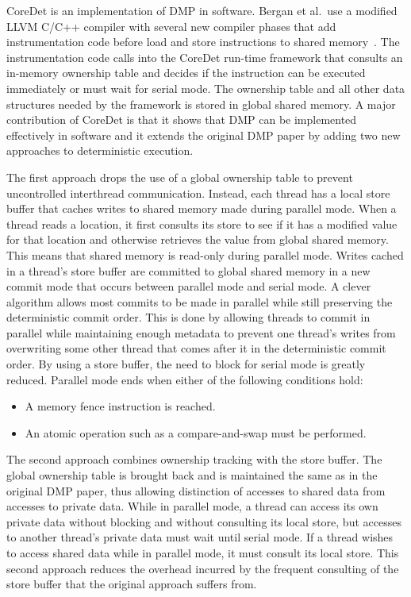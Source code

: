 CoreDet is an implementation of DMP in software.  Bergan et al.\ use a
modified LLVM C/C++ compiler with several new compiler phases that add
instrumentation code before load and store instructions to shared
memory~\cite{coredet}.  The instrumentation code calls into the
CoreDet run-time framework that consults an in-memory ownership table
and decides if the instruction can be executed immediately or must
wait for serial mode.  The ownership table and all other data
structures needed by the framework is stored in global shared memory.
A major contribution of CoreDet is that it shows that DMP can be
implemented effectively in software and it extends the original DMP
paper by adding two new approaches to deterministic execution.

The first approach drops the use of a global ownership table to
prevent uncontrolled interthread communication.  Instead, each thread
has a local store buffer that caches writes to shared memory made
during parallel mode.  When a thread reads a location, it first
consults its store to see if it has a modified value for that location
and otherwise retrieves the value from global shared memory.  This
means that shared memory is read-only during parallel mode.  Writes
cached in a thread's store buffer are committed to global shared
memory in a new commit mode that occurs between parallel mode and
serial mode.  A clever algorithm allows most commits to be made in
parallel while still preserving the deterministic commit order.  This
is done by allowing threads to commit in parallel while maintaining
enough metadata to prevent one thread's writes from overwriting some
other thread that comes after it in the deterministic commit order.
By using a store buffer, the need to block for serial mode is greatly
reduced.  Parallel mode ends when either of the following conditions
hold:

\begin{itemize}
\item A memory fence instruction is reached.

\item An atomic operation such as a compare-and-swap must be
  performed.
\end{itemize}

The second approach combines ownership tracking with the store buffer.
The global ownership table is brought back and is maintained the same
as in the original DMP paper, thus allowing distinction of accesses to
shared data from accesses to private data.  While in parallel mode, a
thread can access its own private data without blocking and without
consulting its local store, but accesses to another thread's private
data must wait until serial mode.  If a thread wishes to access shared
data while in parallel mode, it must consult its local store.  This
second approach reduces the overhead incurred by the frequent
consulting of the store buffer that the original approach suffers
from.

